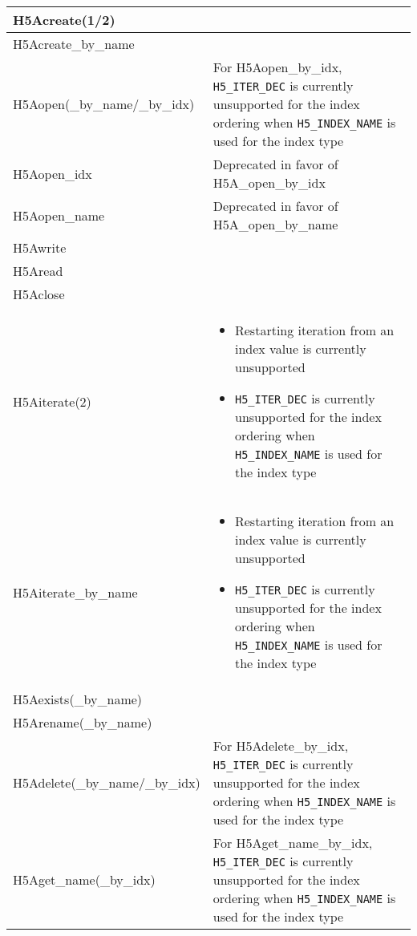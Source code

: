 \documentclass[../users_guide.tex]{subfiles}
\begin{document}
\begin{center}
\begin{tabularx}{\linewidth}{| X | >{\RaggedRight}X |}
H5Acreate(1/2) & \\ \hline
H5Acreate\_by\_name & \\ \hline
H5Aopen(\_by\_name/\_by\_idx) & For H5Aopen\_by\_idx, \texttt{H5\_ITER\_DEC} is currently unsupported for the index ordering when \texttt{H5\_INDEX\_NAME} is used for the index type\\ \hline
H5Aopen\_idx & Deprecated in favor of H5A\_open\_by\_idx\\ \hline
H5Aopen\_name & Deprecated in favor of H5A\_open\_by\_name\\ \hline
H5Awrite & \\ \hline
H5Aread & \\ \hline
H5Aclose & \\ \hline
H5Aiterate(2) & \begin{itemize}
                    \item Restarting iteration from an index value is currently unsupported\footnotemark[1]
                    \item \texttt{H5\_ITER\_DEC} is currently unsupported for the index ordering when \texttt{H5\_INDEX\_NAME} is used for the index type
                \end{itemize}\\ \hline
H5Aiterate\_by\_name & \begin{itemize}
                           \item Restarting iteration from an index value is currently unsupported\footnotemark[1]
                           \item \texttt{H5\_ITER\_DEC} is currently unsupported for the index ordering when \texttt{H5\_INDEX\_NAME} is used for the index type
                       \end{itemize}\\ \hline
H5Aexists(\_by\_name) & \\ \hline
H5Arename(\_by\_name) & \\ \hline
H5Adelete(\_by\_name/\_by\_idx) & For H5Adelete\_by\_idx, \texttt{H5\_ITER\_DEC} is currently unsupported for the index ordering when \texttt{H5\_INDEX\_NAME} is used for the index type\\ \hline
H5Aget\_name(\_by\_idx) & For H5Aget\_name\_by\_idx, \texttt{H5\_ITER\_DEC} is currently unsupported for the index ordering when \texttt{H5\_INDEX\_NAME} is used for the index type\\ \hline
\end{tabularx}



\end{center}
\end{document}
